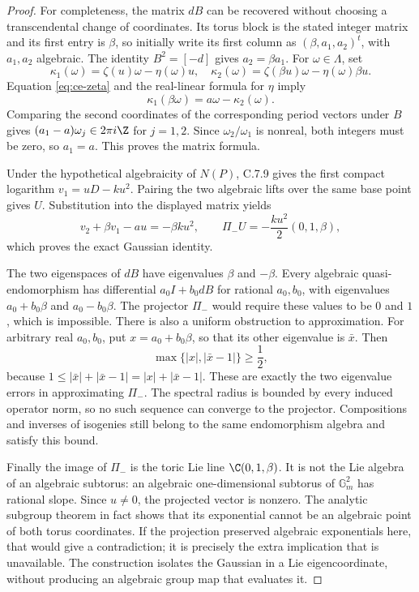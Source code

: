 \begin{proof}
For completeness, the matrix $dB$ can be recovered without
choosing a transcendental change of coordinates. Its torus
block is the stated integer matrix and its first entry is
$\beta$, so initially write its first column as
$(\beta,a_1,a_2)^t$, with $a_1,a_2$ algebraic.
The identity $B^2=[-d]$ gives $a_2=\beta a_1$.
For $\omega\in\Lambda$, set
\[
 \kappa_1(\omega)=\zeta(u)\omega-\eta(\omega)u,
 \quad
 \kappa_2(\omega)=\zeta(\beta u)\omega-\eta(\omega)\beta u.
\]
Equation \eqref{eq:ce-zeta} and the real-linear formula for
$\eta$ imply
\[
 \kappa_1(\beta\omega)=a\omega-\kappa_2(\omega).
\]
Comparing the second coordinates of the corresponding period
vectors under $B$ gives
$(a_1-a)\omega_j\in2\pi i\Z$ for $j=1,2$.
Since $\omega_2/\omega_1$ is nonreal, both integers must
be zero, so $a_1=a$. This proves the matrix formula.

Under the hypothetical algebraicity of $N(P)$, C.7.9 gives
the first compact logarithm $v_1=uD-ku^2$. Pairing the
two algebraic lifts over the same base point gives $U$.
Substitution into the displayed matrix yields
\[
 v_2+\beta v_1-au=-\beta ku^2,
 \qquad
 \Pi_-U=-\frac{ku^2}{2}(0,1,\beta),
\]
which proves the exact Gaussian identity.

The two eigenspaces of $dB$ have eigenvalues $\beta$ and
$-\beta$. Every algebraic quasi-endomorphism has differential
$a_0I+b_0dB$ for rational $a_0,b_0$, with eigenvalues
$a_0+b_0\beta$ and $a_0-b_0\beta$. The projector
$\Pi_-$ would require these values to be $0$ and $1$,
which is impossible. There is also a uniform obstruction to
approximation. For arbitrary real $a_0,b_0$, put
$x=a_0+b_0\beta$, so that its other eigenvalue is
$\bar x$. Then
\begin{equation}\label{eq:ce-gap}
 \max\{|x|,|\bar x-1|\}\ge\frac12,
\end{equation}
because $1\le|\bar x|+|\bar x-1|=|x|+|\bar x-1|$.
These are exactly the two eigenvalue errors in approximating
$\Pi_-$. The spectral radius is bounded by every induced
operator norm, so no such sequence can converge to the
projector. Compositions and inverses of isogenies still belong
to the same endomorphism algebra and satisfy this bound.

Finally the image of $\Pi_-$ is the toric Lie line
$\C(0,1,\beta)$. It is not the Lie algebra of an algebraic
subtorus: an algebraic one-dimensional subtorus of
$\mathbb G_m^2$ has rational slope. Since $u\ne0$,
the projected vector is nonzero. The analytic subgroup
theorem in fact shows that its exponential cannot be an
algebraic point of both torus coordinates. If the projection
preserved algebraic exponentials here, that would give a
contradiction; it is precisely the extra implication that
is unavailable. The construction isolates the Gaussian in
a Lie eigencoordinate, without producing an algebraic
group map that evaluates it.
\end{proof}
